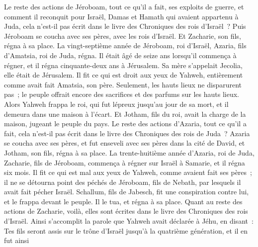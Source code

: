 \begin{multicols}{2}
Le reste des actions de Jéroboam, tout ce qu'il a fait, ses exploits de guerre, et comment il reconquit pour Israël, Damas et Hamath qui avaient appartenu à Juda, cela n'est-il pas écrit dans le livre des Chroniques des rois d'Israël~?
Puis Jéroboam se coucha avec ses pères, avec les rois d'Israël. Et Zacharie, son fils, régna à sa place.
\VerseOne{}La vingt-septième année de Jéroboam, roi d'Israël, Azaria, fils d'Amatsia, roi de Juda, régna.
Il était âgé de seize ans lorsqu'il commença à régner, et il régna cinquante-deux ans à Jérusalem. Sa mère s'appelait Jecolia, elle était de Jérusalem.
Il fit ce qui est droit aux yeux de Yahweh, entièrement comme avait fait Amatsia, son père.
Seulement, les hauts lieux ne disparurent pas~; le peuple offrait encore des sacrifices et des parfums sur les hauts lieux.
Alors Yahweh frappa le roi, qui fut lépreux jusqu'au jour de sa mort, et il demeura dans une maison à l'écart. Et Jotham, fils du roi, avait la charge de la maison, jugeant le peuple du pays.
Le reste des actions d'Azaria, tout ce qu'il a fait, cela n'est-il pas écrit dans le livre des Chroniques des rois de Juda~?
Azaria se coucha avec ses pères, et fut enseveli avec ses pères dans la cité de David, et Jotham, son fils, régna à sa place.
La trente-huitième année d'Azaria, roi de Juda, Zacharie, fils de Jéroboam, commença à régner sur Israël à Samarie, et il régna six mois.
Il fit ce qui est mal aux yeux de Yahweh, comme avaient fait ses pères~; il ne se détourna point des péchés de Jéroboam, fils de Nebath, par lesquels il avait fait pécher Israël.
Schallum, fils de Jabesch, fit une conspiration contre lui, et le frappa devant le peuple. Il le tua, et régna à sa place.
Quant au reste des actions de Zacharie, voilà, elles sont écrites dans le livre des Chroniques des rois d'Israël.
Ainsi s'accomplit la parole que Yahweh avait déclarée à Jéhu, en disant~: Tes fils seront assis sur le trône d'Israël jusqu'à la quatrième génération, et il en fut ainsi

\end{multicols}

